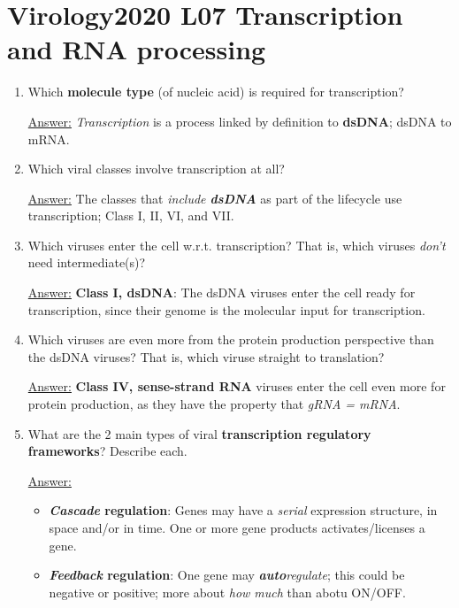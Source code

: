 \documentclass{article}
\newenvironment{QandA}{\begin{enumerate}[label=\bfseries Q\arabic*.]}
                       {\end{enumerate}}
\newenvironment{answered}{\par\normalfont\underline{Answer:}}{}
\begin{document}
\section{Virology2020 L07 Transcription and RNA processing}
\begin{QandA}
  \item{Which \textbf{molecule type} (of nucleic acid) is required for transcription?}
    \begin{answered}
    \textit{Transcription} is a process linked by definition to \textbf{dsDNA}; dsDNA to mRNA.
    \end{answered}
  \item{Which viral classes involve transcription at all?}
    \begin{answered}
    The classes that \textit{include \textbf{dsDNA}} as part of the lifecycle use transcription; Class I, II, VI, and VII.
    \end{answered}
  \item{Which viruses enter the cell  w.r.t. transcription? That is, which viruses \textit{don't} need intermediate(s)?}
    \begin{answered}
    \textbf{Class I, dsDNA}: The dsDNA viruses enter the cell ready for transcription, since their genome is the molecular input for transcription.
    \end{answered}
  \item{Which viruses are even more  from the protein production perspective than the  dsDNA viruses? That is, which viruse  straight to translation?}
    \begin{answered}
    \textbf{Class IV, sense-strand RNA} viruses enter the cell even more  for protein production, as they have the property that \textit{gRNA = mRNA}.
    \end{answered}
  \item{What are the 2 main types of viral \textbf{transcription regulatory frameworks}? Describe each.}
    \begin{answered}
    \begin{itemize}
      \item{\textbf{\textit{Cascade} regulation}: Genes may have a \textit{serial} expression structure, in space and/or in time. One or more  gene products activates/licenses a  gene.}
      \item{\textbf{\textit{Feedback} regulation}: One gene may \textit{\textbf{auto}regulate}; this could be negative or positive; more about \textit{how much} than abotu ON/OFF.}

\end{itemize}
\end{answered}
\end{QandA}
\end{document}
